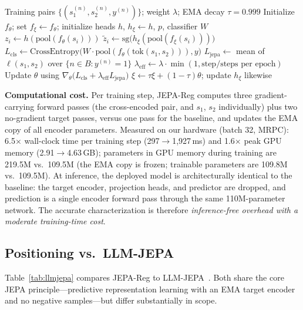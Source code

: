 \documentclass[sigconf]{acmart}
\begin{document}
\begin{algorithm}[!tb]
\caption{JEPA-Reg training}
\label{alg:jepareg}
\begin{algorithmic}[1]
\Require Training pairs $\{(s_1^{(n)}, s_2^{(n)}, y^{(n)})\}$; weight $\lambda$; EMA decay $\tau=0.999$
\State Initialize $f_\theta$; set $f_\xi \leftarrow f_\theta$; initialize heads $h$, $h_\xi \leftarrow h$, $p$, classifier $W$
  \State $z_i \leftarrow h(\mathrm{pool}(f_\theta(s_i)))$ 
  \State $\tilde{z}_i \leftarrow \mathrm{sg}\big(h_\xi(\mathrm{pool}(f_\xi(s_i)))\big)$ 
  \State $L_{\mathrm{cls}} \leftarrow \mathrm{CrossEntropy}\big(W \cdot \mathrm{pool}(f_\theta(\mathrm{tok}(s_1,s_2))), y\big)$
  \State $L_{\mathrm{jepa}} \leftarrow$ mean of $\ell(s_1,s_2)$ over $\{n \in B : y^{(n)}{=}1\}$ 
  \State $\lambda_{\mathrm{eff}} \leftarrow \lambda \cdot \min(1, \text{step}/\text{steps per epoch})$ 
  \State Update $\theta$ using $\nabla_\theta\big(L_{\mathrm{cls}} + \lambda_{\mathrm{eff}} L_{\mathrm{jepa}}\big)$ 
  \State $\xi \leftarrow \tau\xi + (1-\tau)\theta$; update $h_\xi$ likewise 
\EndFor
\end{algorithmic}
\end{algorithm}

\textbf{Computational cost.} Per training step, JEPA-Reg computes three gradient-carrying forward passes (the cross-encoded pair, and $s_1$, $s_2$ individually) plus two no-gradient target passes, versus one pass for the baseline, and updates the EMA copy of all encoder parameters. Measured on our hardware (batch 32, MRPC): 6.5$\times$ wall-clock time per training step (297$\rightarrow$1,927\,ms) and 1.6$\times$ peak GPU memory (2.91$\rightarrow$4.63\,GB); parameters in GPU memory during training are 219.5M vs.\ 109.5M (the EMA copy is frozen; trainable parameters are 109.8M vs.\ 109.5M). At inference, the deployed model is architecturally identical to the baseline: the target encoder, projection heads, and predictor are dropped, and prediction is a single encoder forward pass through the same 110M-parameter network. The accurate characterization is therefore \emph{inference-free overhead with a moderate training-time cost}.

\subsection{Positioning vs.\ LLM-JEPA}
Table~\ref{tab:llmjepa} compares JEPA-Reg to LLM-JEPA~\cite{huang2025llmjepa}. Both share the core JEPA principle---predictive representation learning with an EMA target encoder and no negative samples---but differ substantially in scope.
\end{document}
